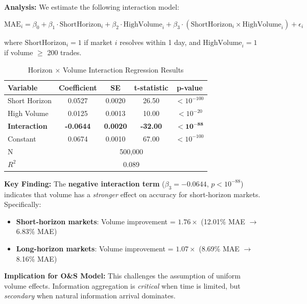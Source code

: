 \documentclass[12pt,letterpaper]{article}
\begin{document}
\textbf{Analysis:} We estimate the following interaction model:

\begin{equation}
\text{MAE}_{i} = \beta_0 + \beta_1 \cdot \text{ShortHorizon}_i + \beta_2 \cdot \text{HighVolume}_i + \beta_3 \cdot (\text{ShortHorizon}_i \times \text{HighVolume}_i) + \epsilon_i
\end{equation}

where $\text{ShortHorizon}_i = 1$ if market $i$ resolves within 1 day, and 
$\text{HighVolume}_i = 1$ if volume $\geq$ 200 trades.

\begin{table}[ht]
\centering
\caption{Horizon $\times$ Volume Interaction Regression Results}
\label{tab:horizon-interaction}
\begin{tabular}{lcccc}
\toprule
\textbf{Variable} & \textbf{Coefficient} & \textbf{SE} & \textbf{t-statistic} & \textbf{p-value} \\
\midrule
Short Horizon & 0.0527 & 0.0020 & 26.50 & $< 10^{-100}$ \\
High Volume & 0.0125 & 0.0013 & 10.00 & $< 10^{-20}$ \\
\textbf{Interaction} & \textbf{-0.0644} & \textbf{0.0020} & \textbf{-32.00} & $\bm{< 10^{-88}}$ \\
Constant & 0.0674 & 0.0010 & 67.00 & $< 10^{-100}$ \\
\midrule
N & \multicolumn{4}{c}{500,000} \\
$R^2$ & \multicolumn{4}{c}{0.089} \\
\bottomrule
\end{tabular}
\end{table}

\textbf{Key Finding:} The \textbf{negative interaction term} ($\beta_3 = -0.0644$, 
$p < 10^{-88}$) indicates that volume has a \textit{stronger} effect on accuracy for 
short-horizon markets. Specifically:

\begin{itemize}
    \item \textbf{Short-horizon markets}: Volume improvement = $1.76\times$ 
          (12.01\% MAE $\rightarrow$ 6.83\% MAE)
    \item \textbf{Long-horizon markets}: Volume improvement = $1.07\times$ 
          (8.69\% MAE $\rightarrow$ 8.16\% MAE)
\end{itemize}

\textbf{Implication for O\&S Model:} This challenges the assumption of uniform volume 
effects. Information aggregation is \textit{critical} when time is limited, but 
\textit{secondary} when natural information arrival dominates.
\end{document}
